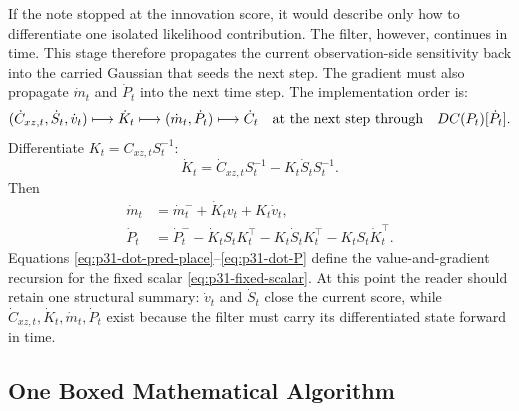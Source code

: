 \documentclass[11pt]{article}
\numberwithin{equation}{section}
\begin{document}
If the note stopped at the innovation score, it would describe only how to
differentiate one isolated likelihood contribution.  The filter, however,
continues in time.  This stage therefore propagates the current observation-side
sensitivity back into the carried Gaussian that seeds the next step.  The
gradient must also propagate \(\dot m_t\) and \(\dot P_t\) into the next
time step.  The implementation order is:
\begin{equation}
  (\dot C_{xz,t},\dot S_t,\dot v_t)
  \longmapsto
  \dot K_t
  \longmapsto
  (\dot m_t,\dot P_t)
  \longmapsto
  \dot C_t
  \quad\hbox{at the next step through}\quad
  DC(P_t)[\dot P_t].
  \label{eq:p32-posterior-sensitivity-order}
\end{equation}
Differentiate \(K_t=C_{xz,t}S_t^{-1}\):
\begin{equation}
  \dot K_t
  =
  \dot C_{xz,t}S_t^{-1}
  -K_t\dot S_tS_t^{-1}.
  \label{eq:p31-dot-K}
\end{equation}
Then
\begin{align}
  \dot m_t
  &=
  \dot m_t^-+\dot K_tv_t+K_t\dot v_t,
  \label{eq:p31-dot-m}\\
  \dot P_t
  &=
  \dot P_t^-
  -\dot K_tS_tK_t^\top
  -K_t\dot S_tK_t^\top
  -K_tS_t\dot K_t^\top.
  \label{eq:p31-dot-P}
\end{align}
Equations \eqref{eq:p31-dot-pred-place}--\eqref{eq:p31-dot-P} define the
value-and-gradient recursion for the fixed scalar
\eqref{eq:p31-fixed-scalar}.  At this point the reader should retain one
structural summary: \(\dot v_t\) and \(\dot S_t\) close the current score, while
\(\dot C_{xz,t},\dot K_t,\dot m_t,\dot P_t\) exist because the filter must carry
its differentiated state forward in time.

\subsection{One Boxed Mathematical Algorithm}
\label{sec:p31-boxed-algorithm}
\end{document}
